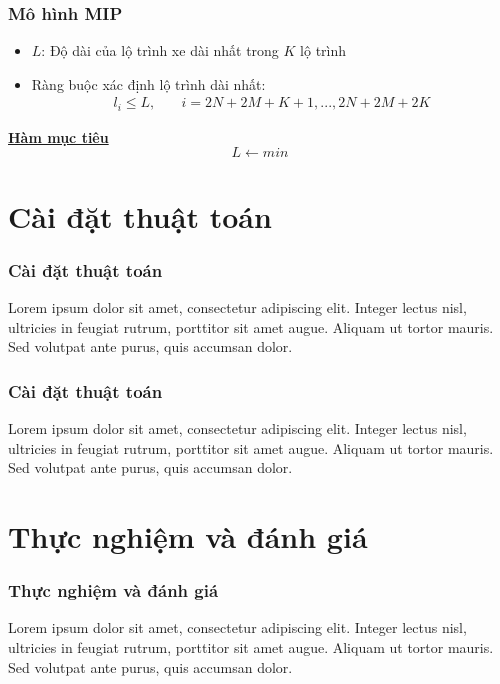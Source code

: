 \documentclass{beamer}
\begin{document}
	\begin{frame}
		\frametitle{Mô hình MIP}
		\begin{itemize}
			\item $L$: Độ dài của lộ trình xe dài nhất trong $K$ lộ trình
			\item Ràng buộc xác định lộ trình dài nhất:
			\begin{align}
			l_i\leq L,\quad & i=2N+2M+K+1,...,2N+2M+2K
			\end{align}
		\end{itemize}
		\textbf{\underline{Hàm mục tiêu}}
		\begin{equation}
		L \leftarrow min
		\end{equation}
	\end{frame}
	
	
	\section{Cài đặt thuật toán}
	
	
	\begin{frame}
		\frametitle{Cài đặt thuật toán}
		Lorem ipsum dolor sit amet, consectetur adipiscing elit. Integer lectus nisl, ultricies in feugiat rutrum, porttitor sit amet augue. Aliquam ut tortor mauris. Sed volutpat ante purus, quis accumsan dolor.
	\end{frame}
	
	
	\begin{frame}
		\frametitle{Cài đặt thuật toán}
		Lorem ipsum dolor sit amet, consectetur adipiscing elit. Integer lectus nisl, ultricies in feugiat rutrum, porttitor sit amet augue. Aliquam ut tortor mauris. Sed volutpat ante purus, quis accumsan dolor.
	\end{frame}
	
	\section{Thực nghiệm và đánh giá}
	
	
	\begin{frame}
		\frametitle{Thực nghiệm và đánh giá}
		Lorem ipsum dolor sit amet, consectetur adipiscing elit. Integer lectus nisl, ultricies in feugiat rutrum, porttitor sit amet augue. Aliquam ut tortor mauris. Sed volutpat ante purus, quis accumsan dolor.
	\end{frame}
\end{document}
